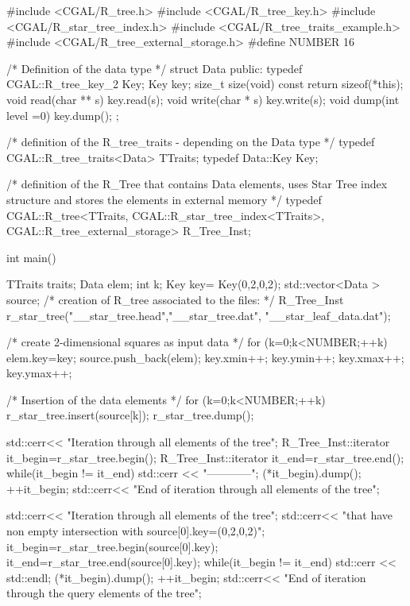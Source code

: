 \ccExample
\begin{cprog}
#include <CGAL/R_tree.h>
#include <CGAL/R_tree_key.h>
#include <CGAL/R_star_tree_index.h>
#include <CGAL/R_tree_traits_example.h>
#include <CGAL/R_tree_external_storage.h>
#define NUMBER 16

/* Definition of the data type */
struct Data{
public:
  typedef CGAL::R_tree_key_2 Key;
  Key key;
  size_t size(void) const {
    return sizeof(*this);
  }
  void read(char ** s) {
    key.read(s);
  }
  void write(char * s) {
    key.write(s);
  }    
  void dump(int level =0){
    key.dump();
  }
};

/* definition of the R_tree_traits - depending on the Data type */
typedef CGAL::R_tree_traits<Data> TTraits; 
typedef Data::Key Key;

/* definition of the R_Tree that contains Data elements, uses 
   Star Tree index structure and stores the elements in 
   external memory */
typedef CGAL::R_tree<TTraits, CGAL::R_star_tree_index<TTraits>,
  CGAL::R_tree_external_storage> R_Tree_Inst;

int main() {
  TTraits traits;
  Data  elem; 
  int k; 
  Key key= Key(0,2,0,2);
  std::vector<Data > source;
  /* creation of R_tree associated to the files: */
  R_Tree_Inst r_star_tree("__star_tree.head","__star_tree.dat", 
                          "__star_leaf_data.dat");

  /* create 2-dimensional squares as input data */
  for (k=0;k<NUMBER;++k) {
    elem.key=key;
    source.push_back(elem);
    key.xmin++; key.ymin++; key.xmax++; key.ymax++;
  }

  /* Insertion of the data elements */
  for (k=0;k<NUMBER;++k) {
    r_star_tree.insert(source[k]);
  }
  r_star_tree.dump();

  std::cerr<< "Iteration through all elements of the tree\n";
  R_Tree_Inst::iterator it_begin=r_star_tree.begin();
  R_Tree_Inst::iterator it_end=r_star_tree.end();
  while(it_begin != it_end){
    std::cerr << "------------";
    (*it_begin).dump();
    ++it_begin;
  }
  std::cerr<< "End of iteration through all elements of the tree\n";

  std::cerr<< "Iteration through all elements of the tree\n";
  std::cerr<< "that have non empty intersection with source[0].key=(0,2,0,2)\n";
  it_begin=r_star_tree.begin(source[0].key);
  it_end=r_star_tree.end(source[0].key);
  while(it_begin != it_end){
    std::cerr << std::endl;
    (*it_begin).dump();
    ++it_begin;
  }
  std::cerr<< "End of iteration through the query elements of the tree\n";

}
\end{cprog}
